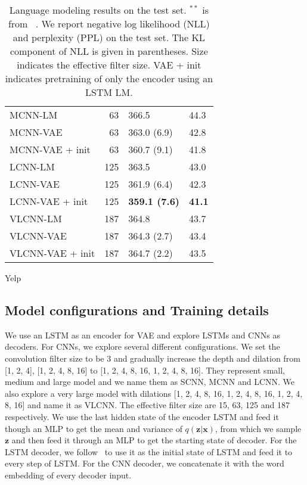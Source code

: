 \documentclass{article}
\begin{document}
\begin{table*}[!th]
\begin{subtable}{0.45\textwidth}
\begin{tabular}{l r l l}
      \midrule
      MCNN-LM & 63 & 366.5 & 44.3 \\
      MCNN-VAE & 63 & 363.0 (6.9) & 42.8 \\
      MCNN-VAE + init & 63 & 360.7 (9.1) & 41.8 \\
      \midrule
      LCNN-LM & 125 & 363.5  & 43.0 \\
      LCNN-VAE & 125  & 361.9 (6.4) & 42.3 \\
      LCNN-VAE + init & 125 & {\bf 359.1 (7.6)} & {\bf 41.1} \\
      \midrule
      VLCNN-LM & 187 & 364.8 & 43.7 \\
      VLCNN-VAE & 187  & 364.3 (2.7) & 43.4 \\
      VLCNN-VAE + init & 187 & 364.7 (2.2) & 43.5 \\
      \bottomrule
    \end{tabular}
    \caption{Yelp}
    \label{tab:yelpppl}
  \end{subtable}
  \caption{Language modeling results on the test set.
  $^{**}$ is from ~\cite{bowman2015generating}.
  We report negative log likelihood (NLL) and perplexity (PPL)
  on the test set. The KL component of NLL is given in parentheses. Size indicates the
  effective filter size. VAE + init indicates pretraining of only the encoder
  using an LSTM LM.
  }
  \label{tab:ppl}
\end{table*}

\subsection{Model configurations and Training details}
We use an LSTM as an encoder for VAE and explore LSTMs and CNNs as decoders. For
CNNs, we explore several different configurations. We set the convolution filter
size to be 3 and gradually increase the depth and dilation from [1, 2, 4], [1,
2, 4, 8, 16] to [1, 2, 4, 8, 16, 1, 2, 4, 8, 16]. They represent small, medium
and large model and we name them as SCNN, MCNN and LCNN. We also explore a very large
model with dilations [1, 2, 4, 8, 16, 1, 2, 4, 8, 16, 1, 2, 4, 8, 16] and name it
as VLCNN. The effective filter size are 15, 63, 125 and 187 respectively. We
use the last hidden state of the encoder LSTM and feed it though an MLP to get the
mean and variance of $q(\mathbf{z}|\mathbf{x})$, from which we sample
$\mathbf{z}$ and then feed it through an MLP to get the starting state of decoder.
For the LSTM decoder, we follow~\cite{bowman2015generating} to use it as the initial state
of LSTM and feed it to every step of LSTM. For the CNN decoder, we concatenate it with the
word embedding of every decoder input.
\end{document}
